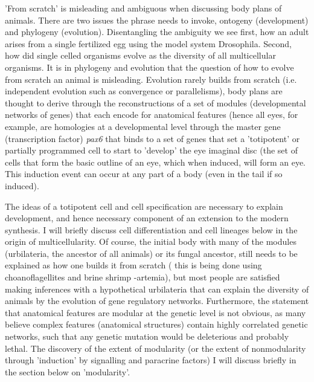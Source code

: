 'From scratch' is misleading and ambiguous when discussing body plans of animals.  There are two issues the phrase needs to invoke, ontogeny (development) and phylogeny (evolution).  Disentangling the ambiguity we see first, how an adult arises from a single fertilized egg using the model system Drosophila.  Second, how did single celled organisms evolve as the diversity of all multicellular organisms.  It is in phylogeny and evolution that the question of how to evolve from scratch an animal is misleading.  Evolution rarely builds from scratch (i.e. independent evolution such as convergence or parallelisms), body plans are thought to derive through the reconstructions of a set of modules (developmental networks of genes) that each encode for anatomical features (hence all eyes, for example, are homologies at a developmental level through the master gene (transcription factor) \textit{pax6} that binds to a set of genes that set a 'totipotent' or partially programmed cell to start to 'develop' the eye imaginal disc (the set of cells that form the basic outline of an eye, which when induced, will form an eye.  This induction event can occur at any part of a body (even in the tail if so induced)\cite{devogilbert}.  

The ideas of a totipotent cell and cell specification are necessary to explain development, and hence necessary component of an extension to the modern synthesis.  I will briefly discuss cell differentiation and cell lineages below in the origin of multicellularity.  Of course, the initial body with many of the modules (urbilateria, the ancestor of all animals) or its fungal ancestor, still needs to be explained as how one builds it from scratch ( this is being done using choanoflagellites and brine shrimp -artemia), but most people are satisfied making inferences with a hypothetical urbilateria that can explain the diversity of animals by the evolution of gene regulatory networks.  Furthermore, the statement that anatomical features are modular at the genetic level is not obvious, as many believe complex features (anatomical structures) contain highly correlated genetic networks, such that any genetic mutation would be deleterious and probably lethal.  The discovery of the extent of modularity (or the extent of nonmodularity through 'induction' by signalling and paracrine factors) I will discuss briefly in the section below on 'modularity'.        


